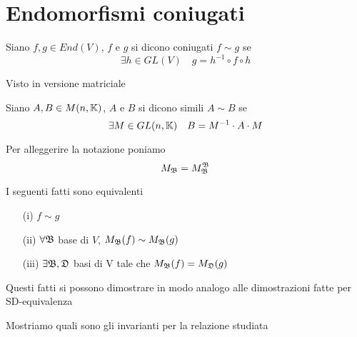 \section{Endomorfismi coniugati}

\begin{defn}[Coniugati]\bianco
Siano $f,g \in End(V) $, $f$ e $ g$ si dicono coniugati $ f\sim g $ se 
$$ \exists h \in GL(V) \quad g = h^{-1} \circ f \circ h $$ 
\end{defn} \spazio
Visto in versione matriciale
\begin{defn}[Simili]\bianco
Siano $A,B \in M(n,\mathbb{K}) $, $A$ e $B$ si dicono simili $ A \sim B $ se 
$$ \exists M \in GL(n,\mathbb{K}) \quad B=M^{-1} \cdot A \cdot M $$
\end{defn} \spazio
\begin{oss} Per alleggerire la notazione poniamo 
$$M_{\mathfrak{B}}=M_{\mathfrak{B}}^{\mathfrak{B}}$$
\end{oss}
\begin{prop} I seguenti fatti sono equivalenti
\begin{itemize}
\item[(i)] $ f\sim g$ 
\item[(ii)] $\forall \mathfrak{B} $ base di $V$, $M_{\mathfrak{B}}(f) \sim M_{\mathfrak{B}}(g)$
\item[(iii)] $\exists \mathfrak{B}, \mathfrak{D} $ basi di V tale che $ M_{\mathfrak{B}}(f)=M_{\mathfrak{D}}(g)$
\end{itemize}
Questi fatti si possono dimostrare in modo analogo alle dimostrazioni fatte per  SD-equivalenza
\end{prop}
\spazio
Mostriamo quali sono gli invarianti per la relazione studiata
